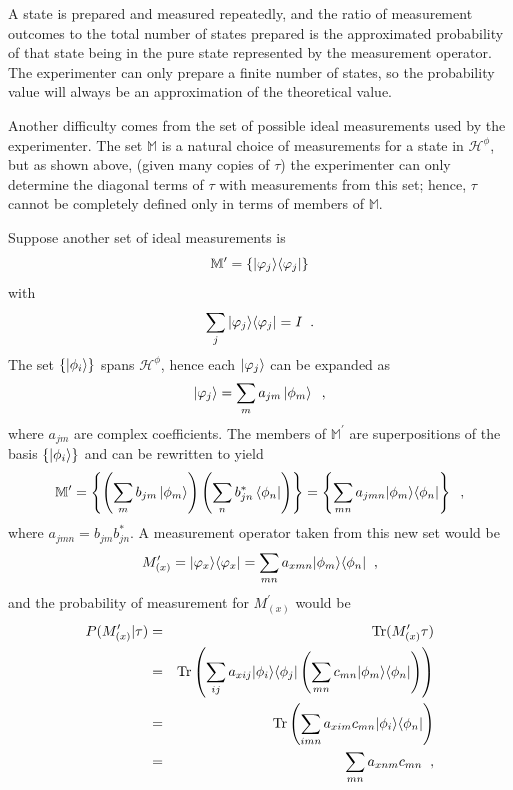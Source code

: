 A state is prepared and measured repeatedly, and the ratio of measurement outcomes to the total number of states prepared is the approximated probability of that state being in the pure state represented by the measurement operator.  The experimenter can only prepare a finite number of states, so the probability value will always be an approximation of the theoretical value.   

Another difficulty comes from the set of possible ideal measurements used by the experimenter.  The set $\mathbb{M}$ is a natural choice of measurements for a state in $\mathcal{H}^\phi$, but as shown above, (given many copies of $\tau$) the experimenter can only determine the diagonal terms of $\tau$ with measurements from this set; hence, $\tau$ cannot be completely defined only in terms of members of $\mathbb{M}$.  

Suppose another set of ideal measurements is 
$$
\mathbb{M}^\prime = \{|\varphi_j\rangle\langle\varphi_j|\}
$$
with
$$
\sum_j |\varphi_j\rangle\langle\varphi_j| = I\;\;.
$$
The set $\{\left|\phi_i\right\rangle\}$ spans $\mathcal{H}^\phi$, hence each $\left|\varphi_j\right\rangle$ can be expanded as
$$
\left|\varphi_j\right\rangle = \sum_{m} a_{jm} \left|\phi_m\right\rangle\;\;,
$$
where $a_{jm}$ are complex coefficients.  The members of $\mathbb{M}^\prime$ are superpositions of the basis $\{\left|\phi_i\right\rangle\}$ and can be rewritten to yield
$$
\mathbb{M}^\prime = \left\{\left(\sum_{m} b_{jm} \left|\phi_m\right\rangle\right)\left(\sum_{n} b^*_{jn} \left\langle\phi_n\right|\right)\right\} = \left\{\sum_{mn} a_{jmn} |\phi_m\rangle\langle\phi_n|\right\}\;\;,
$$
where $a_{jmn}=b_{jm}b^*_{jn}$.  A measurement operator taken from this new set would be 
$$
M_{(x)}^\prime = |\varphi_x\rangle\langle\varphi_x| = \sum_{mn} a_{xmn} |\phi_m\rangle\langle\phi_n|\;\;,
$$
and the probability of measurement for $M_{(x)}^\prime$ would be
\begin{eqnarray}
P(M_{(x)}^\prime|\tau) &=& \operatorname{Tr}(M_{(x)}^\prime \tau)\nonumber\\
&=& \operatorname{Tr}\left( \sum_{ij} a_{xij} |\phi_i\rangle\langle\phi_j| \left( \sum_{mn} c_{mn} |\phi_m\rangle\langle\phi_n| \right) \right)\nonumber\\
&=& \operatorname{Tr}\left( \sum_{imn} a_{xim} c_{mn} |\phi_i\rangle\langle\phi_n| \right)\nonumber\\
&=& \sum_{mn} a_{xnm} c_{mn} \label{eqn:offdiagterms}\;\;,
\end{eqnarray}

